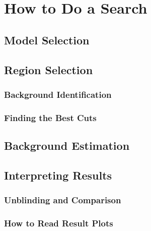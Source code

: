 \chapter{How to Do a Search}

\section{Model Selection}

\section{Region Selection}

\subsection{Background Identification}\label{sec:background}

\subsection{Finding the Best Cuts}

\section{Background Estimation}

\section{Interpreting Results}

\subsection{Unblinding and Comparison}

\subsection{How to Read Result Plots}